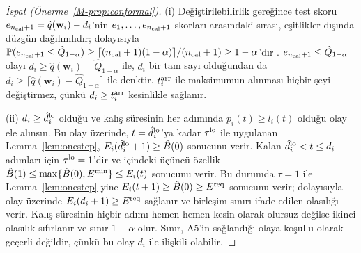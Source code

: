 \begin{proof}[İspat (Önerme~\ref{M-prop:conformal})]
(i) Değiştirilebilirlik gereğince test skoru $e_{n_{\mathrm{cal}}+1}=\hat q(\mathbf w_i)-d_i$'nin $e_1,\dots,e_{n_{\mathrm{cal}}+1}$ skorları arasındaki sırası, eşitlikler dışında düzgün dağılımlıdır; dolayısıyla $\mathbb P(e_{n_{\mathrm{cal}}+1}\le\hat Q_{1-\alpha})\ge\lceil(n_{\mathrm{cal}}+1)(1-\alpha)\rceil/(n_{\mathrm{cal}}+1)\ge1-\alpha$'dır \cite{vovk2022algorithmic,lei2018distributionfree}.
$e_{n_{\mathrm{cal}}+1}\le\hat Q_{1-\alpha}$ olayı $d_i\ge\hat q(\mathbf w_i)-\hat Q_{1-\alpha}$ ile, $d_i$ bir tam sayı olduğundan da $d_i\ge\lceil\hat q(\mathbf w_i)-\hat Q_{1-\alpha}\rceil$ ile denktir.
$t_i^{\mathrm{arr}}$ ile maksimumun alınması hiçbir şeyi değiştirmez, çünkü $d_i\ge t_i^{\mathrm{arr}}$ kesinlikle sağlanır.

(ii) $d_i\ge\hat d_i^{\mathrm{lo}}$ olduğu ve kalış süresinin her adımında $p_i(t)\ge l_i(t)$ olduğu olay ele alınsın.
Bu olay üzerinde, $t=\hat d_i^{\mathrm{lo}}$'ya kadar $\tau^{\mathrm{lo}}$ ile uygulanan Lemma~\ref{lem:onestep}, $E_i(\hat d_i^{\mathrm{lo}}+1)\ge\hat B(0)$ sonucunu verir.
Kalan $\hat d_i^{\mathrm{lo}}<t\le d_i$ adımları için $\tau^{\mathrm{lo}}=1$'dir ve  içindeki üçüncü özellik $\hat B(1)\le\max\{\hat B(0),E^{\min}\}\le E_i(t)$ sonucunu verir.
Bu durumda $\tau=1$ ile Lemma~\ref{lem:onestep} yine $E_i(t+1)\ge\hat B(0)\ge E^{\mathrm{req}}$ sonucunu verir; dolayısıyla olay üzerinde $E_i(d_i+1)\ge E^{\mathrm{req}}$ sağlanır ve birleşim sınırı ifade edilen olasılığı verir.
Kalış süresinin hiçbir adımı hemen hemen kesin olarak olursuz değilse ikinci olasılık sıfırlanır ve sınır $1-\alpha$ olur.
Sınır, A5'in sağlandığı olaya koşullu olarak geçerli değildir, çünkü bu olay $d_i$ ile ilişkili olabilir.
\end{proof}
